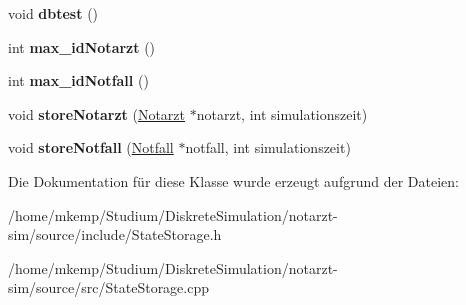 \begin{DoxyCompactItemize}
\item 
void {\bfseries dbtest} ()\hypertarget{classStateStorage_a525c4f4980167fa63dc99e446a825997}{}\label{classStateStorage_a525c4f4980167fa63dc99e446a825997}

\item 
int {\bfseries max\+\_\+id\+Notarzt} ()\hypertarget{classStateStorage_a03a24b950d224309b64296757cea35c6}{}\label{classStateStorage_a03a24b950d224309b64296757cea35c6}

\item 
int {\bfseries max\+\_\+id\+Notfall} ()\hypertarget{classStateStorage_a31d513563b819d071973c2642e3bd16c}{}\label{classStateStorage_a31d513563b819d071973c2642e3bd16c}

\item 
void {\bfseries store\+Notarzt} (\hyperlink{classNotarzt}{Notarzt} $\ast$notarzt, int simulationszeit)\hypertarget{classStateStorage_aa1d8567c55db9f47d18434b33f524f73}{}\label{classStateStorage_aa1d8567c55db9f47d18434b33f524f73}

\item 
void {\bfseries store\+Notfall} (\hyperlink{classNotfall}{Notfall} $\ast$notfall, int simulationszeit)\hypertarget{classStateStorage_a3625f3b3094d88fbb516886d00f02942}{}\label{classStateStorage_a3625f3b3094d88fbb516886d00f02942}

\end{DoxyCompactItemize}


Die Dokumentation für diese Klasse wurde erzeugt aufgrund der Dateien\+:\begin{DoxyCompactItemize}
\item 
/home/mkemp/\+Studium/\+Diskrete\+Simulation/notarzt-\/sim/source/include/State\+Storage.\+h\item 
/home/mkemp/\+Studium/\+Diskrete\+Simulation/notarzt-\/sim/source/src/State\+Storage.\+cpp\end{DoxyCompactItemize}
